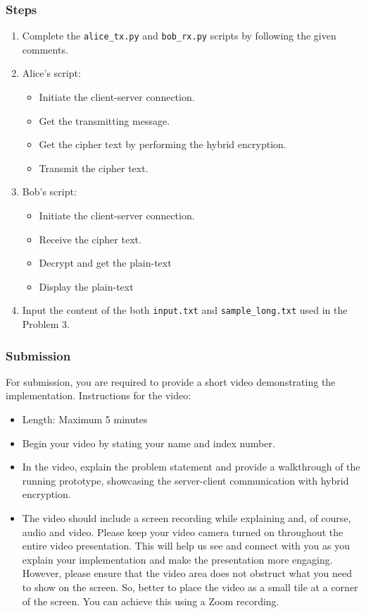 \documentclass[11pt,letterpaper]{article}
\begin{document}
\subsubsection*{Steps}

\begin{enumerate}
    \item Complete the \texttt{alice\_tx.py} and \texttt{bob\_rx.py} scripts by following the given comments.
    \item Alice's script:
        \begin{itemize}[nolistsep]
    	\item Initiate the client-server connection.
            \item Get the transmitting message.
    	\item Get the cipher text by performing the hybrid encryption.
            \item Transmit the cipher text.
        \end{itemize}
    \item Bob's script:
        \begin{itemize}[nolistsep]
    	\item Initiate the client-server connection.
            \item Receive the cipher text.
    	\item Decrypt and get the plain-text
            \item Display the plain-text
        \end{itemize}
    \item Input the content of the both \texttt{input.txt} and \texttt{sample\_long.txt} used in the Problem 3.
\end{enumerate}

\subsubsection*{Submission}

For submission, you are required to provide a short video demonstrating the implementation. Instructions for the video: 

\begin{itemize}
    \item Length: Maximum 5 minutes
    \item Begin your video by stating your name and index number.
    \item In the video, explain the problem statement and provide a walkthrough of the running prototype, showcasing the server-client communication with hybrid encryption.
    \item The video should include a screen recording while explaining and, of course, audio and video. Please keep your video camera turned on throughout the entire video presentation. This will help us see and connect with you as you explain your implementation and make the presentation more engaging. However, please ensure that the video area does not obstruct what you need to show on the screen. So, better to place the video as a small tile at a corner of the screen. You can achieve this using a Zoom recording.
\end{itemize}
\end{document}
